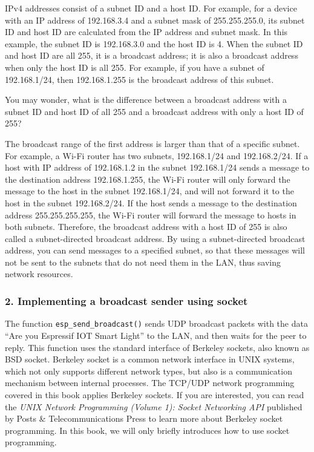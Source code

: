 \documentclass[a4paper,12pt]{book}
\begin{document}
IPv4 addresses consist of a subnet ID and a host ID. For example, for a device with an IP address of 192.168.3.4 and a subnet mask of 255.255.255.0, its subnet ID and host ID are calculated from the IP address and subnet mask. In this example, the subnet ID is 192.168.3.0 and the host ID is 4. When the subnet ID and host ID are all 255, it is a broadcast address; it is also a broadcast address when only the host ID is all 255. For example, if you have a subnet of 192.168.1/24, then 192.168.1.255 is the broadcast address of this subnet.

You may wonder, what is the difference between a broadcast address with a subnet ID and host ID of all 255 and a broadcast address with only a host ID of 255?

The broadcast range of the first address is larger than that of a specific subnet. For example, a Wi-Fi router has two subnets, 192.168.1/24 and 192.168.2/24. If a host with IP address of 192.168.1.2 in the subnet 192.168.1/24 sends a message to the destination address 192.168.1.255, the Wi-Fi router will only forward the message to the host in the subnet 192.168.1/24, and will not forward it to the host in the subnet 192.168.2/24. If the host sends a message to the destination address 255.255.255.255, the Wi-Fi router will forward the message to hosts in both subnets. Therefore, the broadcast address with a host ID of 255 is also called a subnet-directed broadcast address. By using a subnet-directed broadcast address, you can send messages to a specified subnet, so that these messages will not be sent to the subnets that do not need them in the LAN, thus saving network resources.

\subsubsection{2. Implementing a broadcast sender using socket}

The function \verb|esp_send_broadcast()| sends UDP broadcast packets with the data “Are you Espressif IOT Smart Light” to the LAN, and then waits for the peer to reply. This function uses the standard interface of Berkeley sockets, also known as BSD socket. Berkeley socket is a common network interface in UNIX systems, which not only supports different network types, but also is a communication mechanism between internal processes. The TCP/UDP network programming covered in this book applies Berkeley sockets. If you are interested, you can read the \textit{UNIX Network Programming (Volume 1): Socket Networking API} published by Posts \& Telecommunications Press to learn more about Berkeley socket programming. In this book, we will only briefly introduces how to use socket programming.
\end{document}
